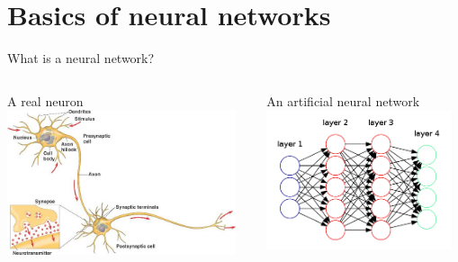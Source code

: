 \documentclass[aspectratio=169]{beamer}
\begin{document}
\section{Basics of neural networks}
	\begin{frame}{What is a neural network?}
		\begin{columns}[T]
		    \begin{column}{.5\textwidth}
		    	\begin{block}{A real neuron}
					\includegraphics[width=0.95\textwidth]{images/neuron.jpg}
		   		\end{block}
		    \end{column}
		    \begin{column}{.5\textwidth}
		    	\begin{block}{An artificial neural network}
		    		\includegraphics[width=0.95\textwidth]{images/nn.png}
		    	\end{block}
		    \end{column}
		  \end{columns}
	\end{frame}
\end{document}

